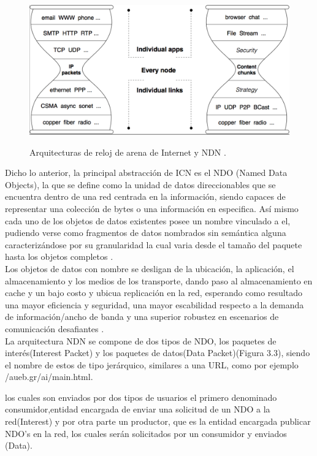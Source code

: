 \documentclass[12pt]{ociamthesis}  %
\begin{document}
	\begin{figure}[!htb]
		\centering
		\includegraphics[width=12cm]{Protocolo_IP_vs_NDN.png}\\
		\caption{Arquitecturas de reloj de arena de Internet y NDN \cite{named_data_networking}.}
		\label{fig:mesh1}
	\end{figure}

Dicho lo anterior, la principal abstracción de ICN es el NDO (Named Data Objects), la que se define como la unidad de datos direccionables que se encuentra dentro de una red centrada en la información, siendo capaces de representar una colección de bytes o una información en especifica. Así mismo cada uno de los objetos de datos existentes posee un nombre vinculado a el, pudiendo verse como fragmentos de datos nombrados sin semántica alguna caracterizándose por su granularidad la cual varia desde el tamaño del paquete hasta los objetos completos \cite{kutscher2016information}\cite{ahlgren2012survey}.\\

Los objetos de datos con nombre se desligan de la ubicación, la aplicación, el almacenamiento y los medios de los transporte, dando paso al almacenamiento en cache y un bajo costo y ubicua replicación en la red, esperando como resultado una mayor eficiencia y seguridad, una mayor escabilidad respecto a la demanda de información/ancho de banda y una superior robustez en escenarios de comunicación desafiantes \cite{kutscher2016information}.\\

La arquitectura NDN se compone de dos tipos de NDO, los paquetes de interés(Interest Packet) y los paquetes de datos(Data Packet)(Figura 3.3), siendo el nombre de estos de tipo jerárquico, similares a una URL, como por ejemplo /aueb.gr/ai/main.html.

los cuales son enviados por dos tipos de usuarios el primero denominado consumidor,entidad encargada de enviar una solicitud de un NDO a la red(Interest) y por otra parte un productor, que es la entidad encargada publicar NDO's en la red, los cuales serán solicitados por un consumidor y enviados (Data).\\
\end{document}
